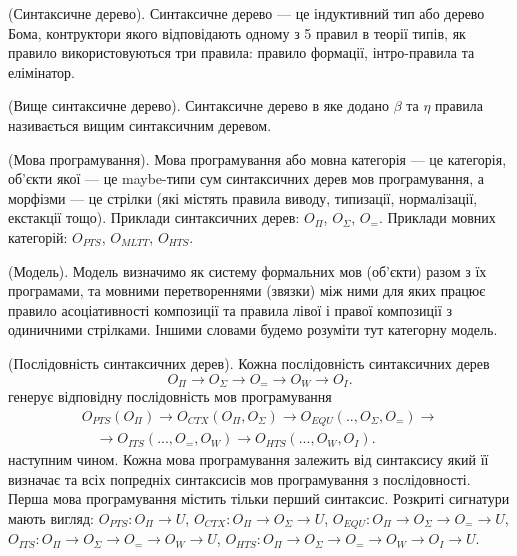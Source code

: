 \begin{definition} (Синтаксичне дерево).
Синтаксичне дерево --- це індуктивний тип або дерево Бома,
контруктори якого відповідають одному з 5 правил в теорії типів,
як правило використовуються три правила: правило формації, інтро-правила та елімінатор.
\end{definition}

\begin{definition} (Вище синтаксичне дерево).
Синтаксичне дерево в яке додано $\beta$ та $\eta$ правила називається
вищим синтаксичним деревом.
\end{definition}

\begin{definition} (Мова програмування).
Мова програмування або мовна категорія --- це категорія,
об’єкти якої --- це maybe-типи сум синтаксичних дерев мов програмування,
  а морфізми --- це стрілки (які містять правила виводу, типизації, нормалізації, екстакції тощо).
Приклади синтаксичних дерев: $O_\Pi$, $O_\Sigma$, $O_=$.
Приклади мовних категорій: $O_{PTS}$, $O_{MLTT}$, $O_{HTS}$.
\end{definition}

\begin{definition} (Модель).
Модель визначимо як систему формальних мов (об'єкти) разом з їх програмами,
та мовними перетвореннями (звязки) між ними для яких працює правило асоціативності
композиції та правила лівої і правої композиції з одиничними стрілками.
Іншими словами будемо розуміти тут категорну модель.
\end{definition}

\begin{definition} (Послідовність синтаксичних дерев). Кожна послідовність
синтаксичних дерев
\begin{equation}
O_\Pi \rightarrow O_\Sigma \rightarrow O_= \rightarrow O_W \rightarrow O_I.
\end{equation}
генерує відповідну послідовність мов програмування
\begin{equation}
\begin{split}
O_{PTS}(O_\Pi) \rightarrow O_{CTX}(O_\Pi,O_\Sigma) \rightarrow O_{EQU}(..,O_\Sigma,O_=) \rightarrow \\
 \quad \rightarrow O_{ITS}(...,O_=,O_W) \rightarrow O_{HTS}(...,O_W,O_I).
\end{split}
\end{equation}
наступним чином. Кожна мова програмування залежить
від синтаксису який її визначає
та всіх попредніх синтаксисів мов програмування з послідовності.
Перша мова програмування містить тільки перший синтаксис.
Розкриті сигнатури мають вигляд:
$O_{PTS}: O_\Pi \rightarrow U$,
$O_{CTX}: O_\Pi \rightarrow O_\Sigma \rightarrow U$,
$O_{EQU}: O_\Pi \rightarrow O_\Sigma \rightarrow O_= \rightarrow U$,
$O_{ITS}: O_\Pi \rightarrow O_\Sigma \rightarrow O_= \rightarrow O_W \rightarrow U$,
$O_{HTS}: O_\Pi \rightarrow O_\Sigma \rightarrow O_= \rightarrow O_W \rightarrow O_I \rightarrow U$.
\end{definition}

